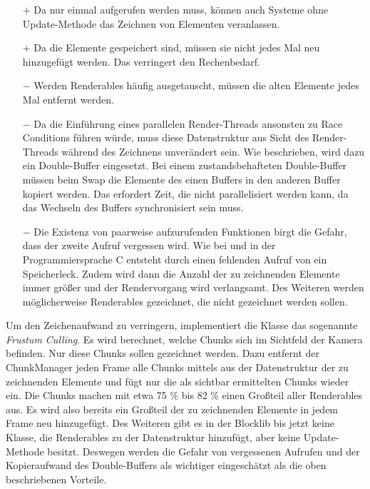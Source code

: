 \begin{itemize}
	\item[$+$] Da  nur einmal aufgerufen werden muss, können auch Systeme ohne Update-Methode das Zeichnen von Elementen veranlassen.
	\item[$+$] Da die Elemente gespeichert sind, müssen sie nicht jedes Mal neu hinzugefügt werden. Das verringert den Rechenbedarf.
	\item[$-$] Werden Renderables häufig ausgetauscht, müssen die alten Elemente jedes Mal entfernt werden.
	\item[$-$] Da die Einführung eines parallelen Render-Threads ansonsten zu Race Conditions führen würde, muss diese Datenstruktur aus Sicht des Render-Threads während des Zeichnens unverändert sein. Wie beschrieben, wird dazu ein Double-Buffer eingesetzt. Bei einem zustandsbehafteten Double-Buffer müssen beim Swap die Elemente des einen Buffers in den anderen Buffer kopiert werden. Das erfordert Zeit, die nicht parallelisiert werden kann, da das Wechseln des Buffers synchronisiert sein muss.
	\item[$-$] Die Existenz von paarweise aufzurufenden Funktionen birgt die Gefahr, dass der zweite Aufruf vergessen wird. Wie bei  und  in der Programmiersprache C entsteht durch einen fehlenden Aufruf von  ein Speicherleck. Zudem wird dann die Anzahl der zu zeichnenden Elemente immer größer und der Rendervorgang wird verlangsamt. Des Weiteren werden möglicherweise Renderables gezeichnet, die nicht gezeichnet werden sollen.
\end{itemize}

Um den Zeichenaufwand zu verringern, implementiert die Klasse  das sogenannte \emph{Frustum Culling}. Es wird berechnet, welche Chunks sich im Sichtfeld der Kamera befinden. Nur diese Chunks sollen gezeichnet werden. Dazu entfernt der ChunkManager jeden Frame alle Chunks mittels  aus der Datenstruktur der zu zeichnenden Elemente und fügt nur die als sichtbar ermittelten Chunks wieder ein. Die Chunks machen mit etwa 
75 \% bis
82 \% einen Großteil aller Renderables aus. Es wird also bereits ein Großteil der zu zeichnenden Elemente in jedem Frame neu hinzugefügt. Des Weiteren gibt es in der Blocklib bis jetzt keine Klasse, die Renderables zu der Datenstruktur hinzufügt, aber keine Update-Methode besitzt. Deswegen werden die Gefahr von vergessenen  Aufrufen und der Kopieraufwand des Double-Buffers als wichtiger eingeschätzt als die oben beschriebenen Vorteile.

